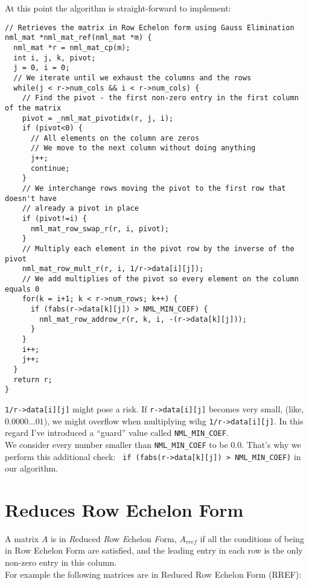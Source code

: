 At this point the algorithm is straight-forward to implement:

\begin{verbatim}
// Retrieves the matrix in Row Echelon form using Gauss Elimination
nml_mat *nml_mat_ref(nml_mat *m) {
  nml_mat *r = nml_mat_cp(m);
  int i, j, k, pivot;
  j = 0, i = 0;
  // We iterate until we exhaust the columns and the rows
  while(j < r->num_cols && i < r->num_cols) {
    // Find the pivot - the first non-zero entry in the first column of the matrix
    pivot = _nml_mat_pivotidx(r, j, i);
    if (pivot<0) {
      // All elements on the column are zeros
      // We move to the next column without doing anything
      j++;
      continue;
    }
    // We interchange rows moving the pivot to the first row that doesn't have
    // already a pivot in place
    if (pivot!=i) {
      nml_mat_row_swap_r(r, i, pivot);
    }
    // Multiply each element in the pivot row by the inverse of the pivot
    nml_mat_row_mult_r(r, i, 1/r->data[i][j]);
    // We add multiplies of the pivot so every element on the column equals 0
    for(k = i+1; k < r->num_rows; k++) {
      if (fabs(r->data[k][j]) > NML_MIN_COEF) {
        nml_mat_row_addrow_r(r, k, i, -(r->data[k][j]));
      } 
    }
    i++;
    j++;
  }
  return r;
} 
\end{verbatim}

{\tt 1/r->data[i][j]} might pose a risk. If {\tt r->data[i][j]} becomes very small, (like, $0.0000\ldots 01$), we might overflow when multiplying wihg {\tt 1/r->data[i][j]}. In this regard I’ve introduced a ``guard'' value called {\tt NML\_MIN\_COEF}.
\\

We consider every number smaller than {\tt NML\_MIN\_COEF} to be 0.0. That’s why we perform this additional check: \ {\tt if (fabs(r->data[k][j]) > NML\_MIN\_COEF)} in our algorithm.

\section{Reduces Row Echelon Form}

A matrix $A$ is in {\it R}educed {\it R}ow {\it E}chelon {\it F}orm, $A_{rref}$ if all the conditions of being in Row Echelon Form are satisfied, and the leading entry in each row is the only non-zero entry in this column.
\\

For example the following matrices are in Reduced Row Echelon Form (RREF):


